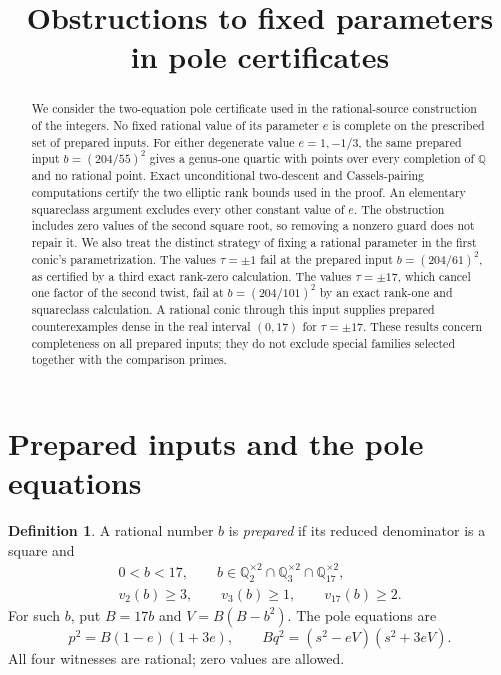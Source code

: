 \documentclass[11pt,a4paper]{article}
\title{Obstructions to fixed parameters in pole certificates}
\author{}\date{}
\theoremstyle{definition}\newtheorem{definition}[theorem]{Definition}
\newcommand{\Q}{\mathbb Q}\newcommand{\Z}{\mathbb Z}
\begin{document}
\maketitle
\begin{abstract}
We consider the two-equation pole certificate used in the rational-source
construction of the integers.  No fixed rational value of its parameter
$e$ is complete on the prescribed set of prepared inputs.  For either
degenerate value $e=1,-1/3$, the same prepared input
$b=(204/55)^2$ gives a genus-one quartic with points over every completion
of $\Q$ and no rational point.  Exact unconditional two-descent and
Cassels-pairing computations certify the two elliptic rank bounds used
in the proof.  An elementary squareclass argument excludes every other
constant value of $e$.  The obstruction includes zero values of the
second square root, so removing a nonzero guard does not repair it.
We also treat the distinct strategy of fixing a rational parameter
in the first conic's parametrization. The values $\tau=\pm1$
fail at the prepared input $b=(204/61)^2$, as certified
by a third exact rank-zero calculation. The values $\tau=\pm17$,
which cancel one factor of the second twist, fail at
$b=(204/101)^2$ by an exact rank-one and squareclass calculation.
A rational conic through this input supplies prepared counterexamples
dense in the real interval $(0,17)$ for $\tau=\pm17$.
These results concern
completeness on all prepared inputs; they do not exclude special
families selected together with the comparison primes.
\end{abstract}

\section{Prepared inputs and the pole equations}

\begin{definition}
A rational number $b$ is \emph{prepared} if its reduced denominator is
a square and
\[
 \begin{gathered}
 0<b<17,\qquad b\in\Q_2^{\times2}\cap\Q_3^{\times2}
                      \cap\Q_{17}^{\times2},\\
 v_2(b)\ge3,\qquad v_3(b)\ge1,\qquad v_{17}(b)\ge2.
 \end{gathered}
\]
For such $b$, put $B=17b$ and $V=B(B-b^2)$.  The pole equations are
\begin{equation}\label{eq:pole}
 p^2=B(1-e)(1+3e),\qquad
 Bq^2=(s^2-eV)(s^2+3eV).
\end{equation}
All four witnesses are rational; zero values are allowed.
\end{definition}
\end{document}
